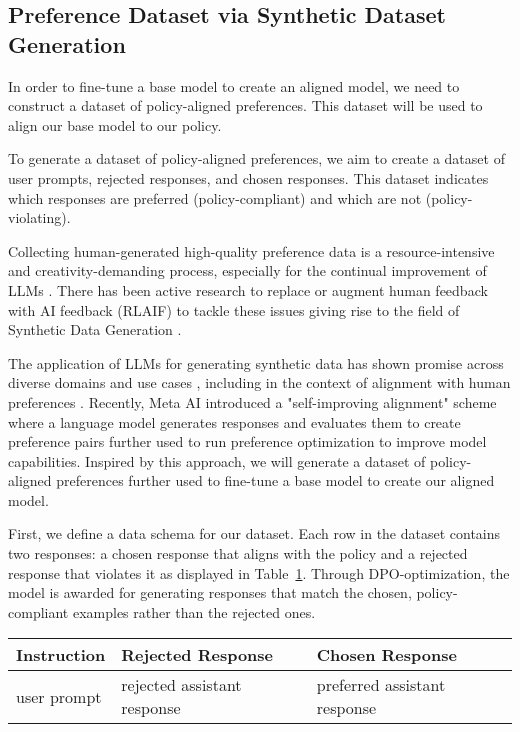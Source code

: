 \subsection{Preference Dataset via Synthetic Dataset Generation}

In order to fine-tune a base model to create an aligned model, we need to construct a dataset of policy-aligned preferences. This dataset will be used to align our base model to our policy.

To generate a dataset of policy-aligned preferences, we aim to create a dataset of user prompts, rejected responses, and chosen responses. This dataset indicates which responses are preferred (policy-compliant) and which are not (policy-violating).

Collecting human-generated high-quality preference data is a resource-intensive and creativity-demanding process, especially for the continual improvement of LLMs . There has been active research to replace or augment human feedback with AI feedback (RLAIF) to tackle these issues  giving rise to the field of Synthetic Data Generation .

The application of LLMs for generating synthetic data has shown promise across diverse domains and use cases , including in the context of alignment with human preferences . Recently, Meta AI  introduced a "self-improving alignment" scheme where a language model generates responses and evaluates them to create preference pairs further used to run preference optimization to improve model capabilities. Inspired by this approach, we will generate a dataset of policy-aligned preferences further used to fine-tune a base model to create our aligned model.

First, we define a data schema for our dataset. Each row in the dataset contains two responses: a chosen response that aligns with the policy and a rejected response that violates it as displayed in Table~\ref{tab:dpo-layout}. Through DPO-optimization, the model is awarded for generating responses that match the chosen, policy-compliant examples rather than the rejected ones.

\begin{table}[H]
\centering
\label{tab:dpo-layout}
\begin{tabular}{|l|l|l|}
\hline
\textbf{Instruction} & \textbf{Rejected Response} & \textbf{Chosen Response} \\
\hline
user prompt & rejected assistant response & preferred assistant response \\
\hline
\end{tabular}
\end{table}

